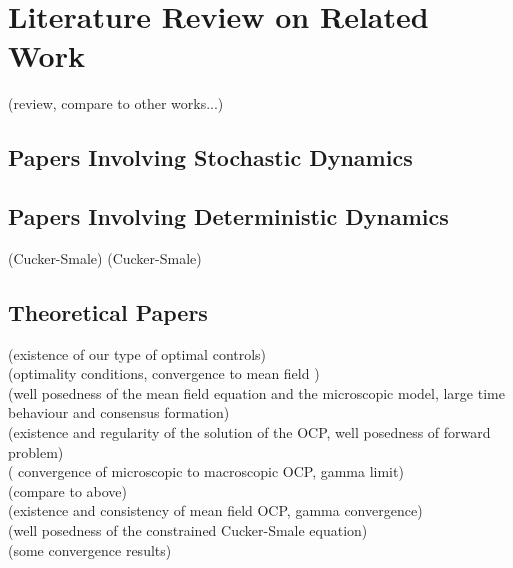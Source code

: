 \documentclass[11pt, a4paper]{article}
\theoremstyle{definition}
\begin{document}

\section*{Literature Review on Related Work}
\cite{Fornasier_20161no1} (review, compare to other works...)


\subsection*{Papers Involving Stochastic Dynamics}
\cite{albi2016mean} 



\subsection*{Papers Involving Deterministic Dynamics}
\cite{albi2016no2}
\cite{albi2016selective} (Cucker-Smale)
\cite{Fornasier_2014}
\cite{Fornasier_2014no2}
\cite{fornasier_lisini_orrieri_savare_2019}
\cite{piccoli2014no1} (Cucker-Smale)


\subsection*{Theoretical Papers}
\cite{albi2016mean} (existence of our type of optimal controls)\\
\cite{burger2019meanfield} (optimality conditions, convergence to mean field )\\

\cite{carrillo2018no1} (well posedness of the mean field equation and the microscopic model, large time behaviour and consensus formation)\\
\cite{carrillo2019mean} (existence and regularity of the solution of the OCP, well posedness of forward problem)\\
\cite{Fornasier_2014}( convergence of microscopic to macroscopic OCP, gamma limit)\\
\cite{Fornasier_2014no2} (compare to above)\\
\cite{fornasier_lisini_orrieri_savare_2019} (existence and consistency of mean field OCP, gamma convergence)\\
\cite{piccoli2014no1} (well posedness of the constrained Cucker-Smale equation)\\
\cite{Pinnau_2017} (some convergence results)
\end{document}
